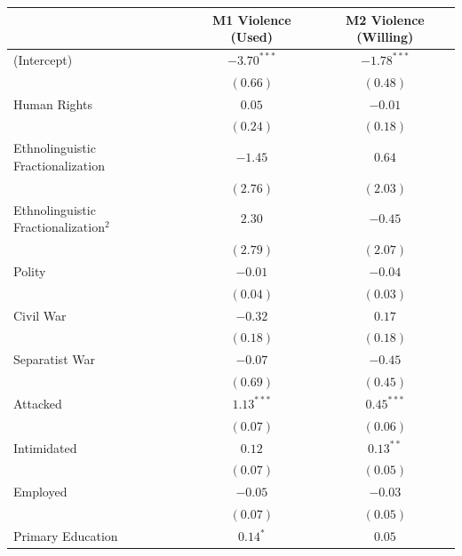 \documentclass[12pt,]{book}
\let\origtable\table
\let\endorigtable\endtable
\renewenvironment{table}[1][2] {
    \singlespacing
    \expandafter\origtable\expandafter[H]
} {
    \endorigtable
}
\theoremstyle{definition}
\theoremstyle{definition}
\theoremstyle{definition}
\theoremstyle{remark}
\begin{document}
\begin{table}
\begin{center}
\begin{tabular}{l c c }
\hline
 & M1 Violence (Used) & M2 Violence (Willing) \\
\hline
(Intercept)                             & $-3.70^{***}$ & $-1.78^{***}$ \\
                                        & $(0.66)$      & $(0.48)$      \\
Human Rights                            & $0.05$        & $-0.01$       \\
                                        & $(0.24)$      & $(0.18)$      \\
Ethnolinguistic Fractionalization       & $-1.45$       & $0.64$        \\
                                        & $(2.76)$      & $(2.03)$      \\
Ethnolinguistic Fractionalization$^{2}$ & $2.30$        & $-0.45$       \\
                                        & $(2.79)$      & $(2.07)$      \\
Polity                                  & $-0.01$       & $-0.04$       \\
                                        & $(0.04)$      & $(0.03)$      \\
Civil War                               & $-0.32$       & $0.17$        \\
                                        & $(0.18)$      & $(0.18)$      \\
Separatist War                          & $-0.07$       & $-0.45$       \\
                                        & $(0.69)$      & $(0.45)$      \\
Attacked                                & $1.13^{***}$  & $0.45^{***}$  \\
                                        & $(0.07)$      & $(0.06)$      \\
Intimidated                             & $0.12$        & $0.13^{**}$   \\
                                        & $(0.07)$      & $(0.05)$      \\
Employed                                & $-0.05$       & $-0.03$       \\
                                        & $(0.07)$      & $(0.05)$      \\
Primary Education                       & $0.14^{*}$    & $0.05$        \\

\end{tabular}
\end{center}
\end{table}
\end{document}
